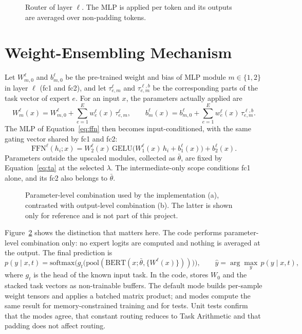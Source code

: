 \begin{figure}[htbp]
  \centering
  \resizebox{.8\linewidth}{!}{}
  \caption{Router of layer $\ell$. The MLP is applied per token and its outputs are averaged over non-padding tokens.}
  \label{fig:router}
\end{figure}

\section{Weight-Ensembling Mechanism}

Let $W^{\ell}_{m,0}$ and $b^{\ell}_{m,0}$ be the pre-trained weight and bias of MLP module $m\in\{1,2\}$ in layer $\ell$ (fc1 and fc2), and let $\tau^{\ell}_{e,m}$ and $\tau^{\ell,b}_{e,m}$ be the corresponding parts of the task vector of expert $e$. For an input $x$, the parameters actually applied are
\begin{equation}
W^{\ell}_m(x)=W^{\ell}_{m,0}+\sum_{e=1}^{E}w^{\ell}_e(x)\,\tau^{\ell}_{e,m},\qquad
b^{\ell}_m(x)=b^{\ell}_{m,0}+\sum_{e=1}^{E}w^{\ell}_e(x)\,\tau^{\ell,b}_{e,m}.
\label{eq:we}
\end{equation}
The MLP of Equation~\eqref{eq:ffn} then becomes input-conditioned, with the same gating vector shared by fc1 and fc2:
\begin{equation}
\mathrm{FFN}^{\ell}(h_i;x)=W^{\ell}_2(x)\,\mathrm{GELU}\big(W^{\ell}_1(x)\,h_i+b^{\ell}_1(x)\big)+b^{\ell}_2(x).
\label{eq:we-ffn}
\end{equation}
Parameters outside the upscaled modules, collected as $\bar\theta$, are fixed by Equation~\eqref{eq:ta} at the selected $\lambda$. The intermediate-only scope conditions fc1 alone, and its fc2 also belongs to $\bar\theta$.

\begin{figure}[htbp]
  \centering
  \resizebox{\linewidth}{!}{}
  \caption{Parameter-level combination used by the implementation (a), contrasted with output-level combination (b). The latter is shown only for reference and is not part of this project.}
  \label{fig:we}
\end{figure}

Figure~\ref{fig:we} shows the distinction that matters here. The code performs parameter-level combination only: no expert logits are computed and nothing is averaged at the output. The final prediction is
\begin{equation}
p(y\mid x,t)=\mathrm{softmax}\Big(g_t\big(\mathrm{pool}(\mathrm{BERT}(x;\bar\theta,\{W^{\ell}(x)\}))\big)\Big),\qquad
\hat y=\arg\max_{y}\,p(y\mid x,t),
\label{eq:prediction}
\end{equation}
where $g_t$ is the head of the known input task. In the code,  stores $W_0$ and the stacked task vectors as non-trainable buffers. The default  mode builds per-sample weight tensors and applies a batched matrix product;  and  modes compute the same result for memory-constrained training and for tests. Unit tests confirm that the modes agree, that constant routing reduces to Task Arithmetic and that padding does not affect routing.

